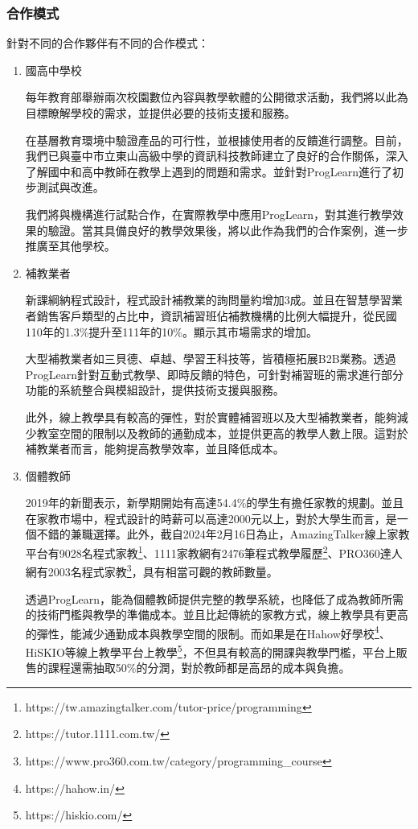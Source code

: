 \subsubsection{合作模式} %

針對不同的合作夥伴有不同的合作模式：

\begin{enumerate}
  \setlength{\parindent}{2em}
  
  \item 國高中學校
  \par 每年教育部舉辦兩次校園數位內容與教學軟體的公開徵求活動，我們將以此為目標瞭解學校的需求，並提供必要的技術支援和服務。
  \par 在基層教育環境中驗證產品的可行性，並根據使用者的反饋進行調整。目前，我們已與臺中市立東山高級中學的資訊科技教師建立了良好的合作關係，深入了解國中和高中教師在教學上遇到的問題和需求。並針對ProgLearn進行了初步測試與改進。
  \par 我們將與機構進行試點合作，在實際教學中應用ProgLearn，對其進行教學效果的驗證。當其具備良好的教學效果後，將以此作為我們的合作案例，進一步推廣至其他學校。
  \item 補教業者
  \par 新課綱納程式設計，程式設計補教業的詢問量約增加3成\cite{ref:補教業者}。並且在智慧學習業者銷售客戶類型的占比中，資訊補習班佔補教機構的比例大幅提升，從民國110年的1.3\%提升至111年的10\%\cite{ref:110產業產值調查報告}\cite{ref:111產業產值調查報告}。顯示其市場需求的增加。
  \par 大型補教業者如三貝德、卓越、學習王科技等，皆積極拓展B2B業務。透過ProgLearn針對互動式教學、即時反饋的特色，可針對補習班的需求進行部分功能的系統整合與模組設計，提供技術支援與服務。
  \par 此外，線上教學具有較高的彈性，對於實體補習班以及大型補教業者，能夠減少教室空間的限制以及教師的通勤成本，並提供更高的教學人數上限。這對於補教業者而言，能夠提高教學效率，並且降低成本。
  \item 個體教師
  \par 2019年的新聞表示，新學期開始有高達54.4\%的學生有擔任家教的規劃\cite{ref:家教}。並且在家教市場中，程式設計的時薪可以高達2000元以上\cite{ref:學生數量}，對於大學生而言，是一個不錯的兼職選擇。此外，截自2024年2月16日為止，AmazingTalker線上家教平台有9028名程式家教\footnote{https://tw.amazingtalker.com/tutor-price/programming}、1111家教網有2476筆程式教學履歷\footnote{https://tutor.1111.com.tw/}、PRO360達人網有2003名程式家教\footnote{https://www.pro360.com.tw/category/programming\_course}，具有相當可觀的教師數量。
  \par 透過ProgLearn，能為個體教師提供完整的教學系統，也降低了成為教師所需的技術門檻與教學的準備成本。並且比起傳統的家教方式，線上教學具有更高的彈性，能減少通勤成本與教學空間的限制。而如果是在Hahow好學校\footnote{https://hahow.in/}、HiSKIO等線上教學平台上教學\footnote{https://hiskio.com/}，不但具有較高的開課與教學門檻，平台上販售的課程還需抽取50\%的分潤，對於教師都是高昂的成本與負擔。
\end{enumerate}
